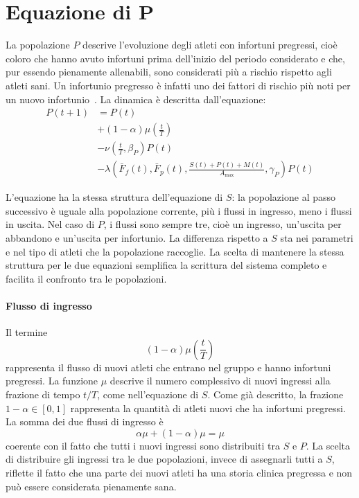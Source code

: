 \section{Equazione di P}

La popolazione $P$ descrive l'evoluzione degli atleti con infortuni pregressi, cioè coloro che hanno avuto infortuni prima dell'inizio del periodo considerato e che, pur essendo pienamente allenabili, sono considerati più a rischio rispetto agli atleti sani. Un infortunio pregresso è infatti uno dei fattori di rischio più noti per un nuovo infortunio~\cite{hagglund2006}. La dinamica è descritta dall'equazione:
\begin{align*}
    P(t+1) &= P(t) \\
        &+ (1 - \alpha) \mu\left(\frac{t}{T}\right) \\
        &- \nu\left(\frac{t}{T}, \beta_P\right) P(t) \\
        &- \lambda\left(\bar{F}_f(t), \bar{F}_p(t), \frac{S(t) + P(t) + M(t)}{A_{\max}}, \gamma_P\right) P(t)
\end{align*}

L'equazione ha la stessa struttura dell'equazione di $S$: la popolazione al passo successivo è uguale alla popolazione corrente, più i flussi in ingresso, meno i flussi in uscita. Nel caso di $P$, i flussi sono sempre tre, cioè un ingresso, un'uscita per abbandono e un'uscita per infortunio. La differenza rispetto a $S$ sta nei parametri e nel tipo di atleti che la popolazione raccoglie. La scelta di mantenere la stessa struttura per le due equazioni semplifica la scrittura del sistema completo e facilita il confronto tra le popolazioni.

\paragraph{Flusso di ingresso}
Il termine
\[
    (1 - \alpha) \mu\left(\frac{t}{T}\right)
\]
rappresenta il flusso di nuovi atleti che entrano nel gruppo e hanno infortuni pregressi. La funzione $\mu$ descrive il numero complessivo di nuovi ingressi alla frazione di tempo $t/T$, come nell'equazione di $S$. Come già descritto, la frazione $1 - \alpha \in [0,1]$ rappresenta la quantità di atleti nuovi che ha infortuni pregressi. \\
La somma dei due flussi di ingresso è
\[
    \alpha\mu + (1-\alpha)\mu = \mu
\]
coerente con il fatto che tutti i nuovi ingressi sono distribuiti tra $S$ e $P$. La scelta di distribuire gli ingressi tra le due popolazioni, invece di assegnarli tutti a $S$, riflette il fatto che una parte dei nuovi atleti ha una storia clinica pregressa e non può essere considerata pienamente sana.

